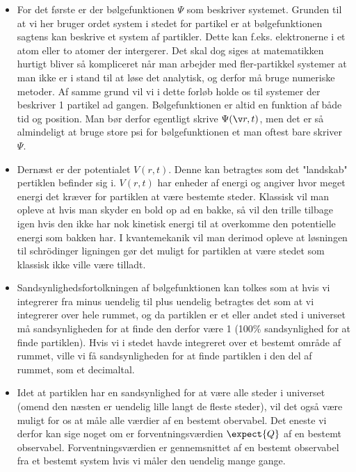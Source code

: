 \begin{itemize}

\item For det første er der bølgefunktionen $\Psi$ som beskriver systemet. Grunden til at vi her bruger ordet system i stedet for partikel er at bølgefunktionen sagtens kan beskrive et system af partikler. Dette kan f.eks. elektronerne i et atom eller to atomer der intergerer. Det skal dog siges at matematikken hurtigt bliver så kompliceret når man arbejder med fler-partikkel systemer at man ikke er i stand til at løse det analytisk, og derfor må bruge numeriske metoder. Af samme grund vil vi i dette forløb holde os til systemer der beskriver 1 partikel ad gangen. Bølgefunktionen er altid en funktion af både tid og position. Man bør derfor egentligt skrive $\Psi(\v r,t)$, men det er så almindeligt at bruge store psi for bølgefunktionen et man oftest bare skriver $\Psi$.

\item Dernæst er der potentialet $V(r,t)$. Denne kan betragtes som det "landskab" pertiklen befinder sig i. $V(r,t)$ har enheder af energi og angiver hvor meget energi det kræver for partiklen at være bestemte steder. Klassisk vil man opleve at hvis man skyder en bold op ad en bakke, så vil den trille tilbage igen hvis den ikke har nok kinetisk energi til at overkomme den potentielle energi som bakken har. I kvantemekanik vil man derimod opleve at løsningen til schrödinger ligningen gør det muligt for partiklen at være stedet som klassisk ikke ville være tilladt.

\item Sandsynlighedsfortolkningen af bølgefunktionen kan tolkes som at hvis vi integrerer fra minus uendelig til plus uendelig betragtes det som at vi integrerer over hele rummet, og da partiklen er et eller andet sted i universet må sandsynligheden for at finde den derfor være 1 (100\%  sandsynlighed for at finde partiklen). Hvis vi i stedet havde integreret over et bestemt område af rummet, ville vi få sandsynligheden for at finde partiklen i den del af rummet, som et decimaltal.

\item Idet at partiklen har en sandsynlighed for at være alle steder i universet (omend den næsten er uendelig lille langt de fleste steder), vil det også være muligt for os at måle alle værdier af en bestemt obervabel. Det eneste vi derfor kan sige noget om er forventningsværdien $\expect{Q}$ af en bestemt observabel. Forventningsværdien er gennemsnittet af en bestemt observabel fra et bestemt system hvis vi måler den uendelig mange gange.


\end{itemize}
